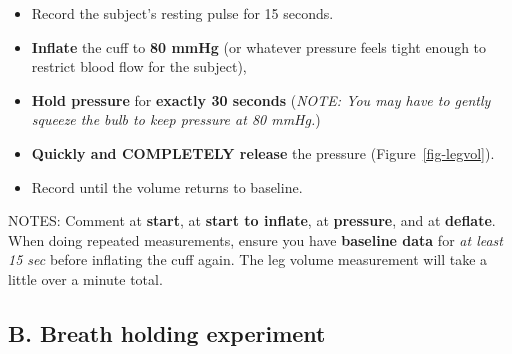 \documentclass[
  letterpaper,
  DIV=11,
  numbers=noendperiod,
  oneside]{scrartcl}
\providecommand{\tightlist}{%
  \setlength{\itemsep}{0pt}\setlength{\parskip}{0pt}}\usepackage{longtable,booktabs,array}
\begin{document}
\begin{tcolorbox}[enhanced jigsaw, arc=.35mm, leftrule=.75mm, coltitle=black, left=2mm, rightrule=.15mm, colbacktitle=quarto-callout-tip-color!10!white, opacitybacktitle=0.6, breakable, titlerule=0mm, colback=white, bottomrule=.15mm, toprule=.15mm, opacityback=0, colframe=quarto-callout-tip-color-frame, toptitle=1mm, title=\textcolor{quarto-callout-tip-color}{\faLightbulb}\hspace{0.5em}{Protocol: Leg volume measurement}, bottomtitle=1mm]

\begin{itemize}
\tightlist
\item
  Record the subject's resting pulse for 15 seconds.
\item
  \textbf{Inflate} the cuff to \textbf{80 mmHg} (or whatever pressure
  feels tight enough to restrict blood flow for the subject),
\item
  \textbf{Hold pressure} for \textbf{exactly 30 seconds} (\emph{NOTE:
  You may have to gently squeeze the bulb to keep pressure at 80 mmHg.})
\item
  \textbf{Quickly and COMPLETELY release} the pressure
  (Figure~\ref{fig-legvol}).
\item
  Record until the volume returns to baseline.
\end{itemize}

{NOTES: Comment at \textbf{start}, at \textbf{start to inflate}, at
\textbf{pressure}, and at \textbf{deflate}.}\\
When doing repeated measurements, ensure you have \textbf{baseline data}
for \emph{at least 15 sec} before inflating the cuff again. The leg
volume measurement will take a little over a minute total.

\end{tcolorbox}

\hypertarget{b.-breath-holding-experiment}{%
\subsection{B. Breath holding
experiment}\label{b.-breath-holding-experiment}}
\end{document}
